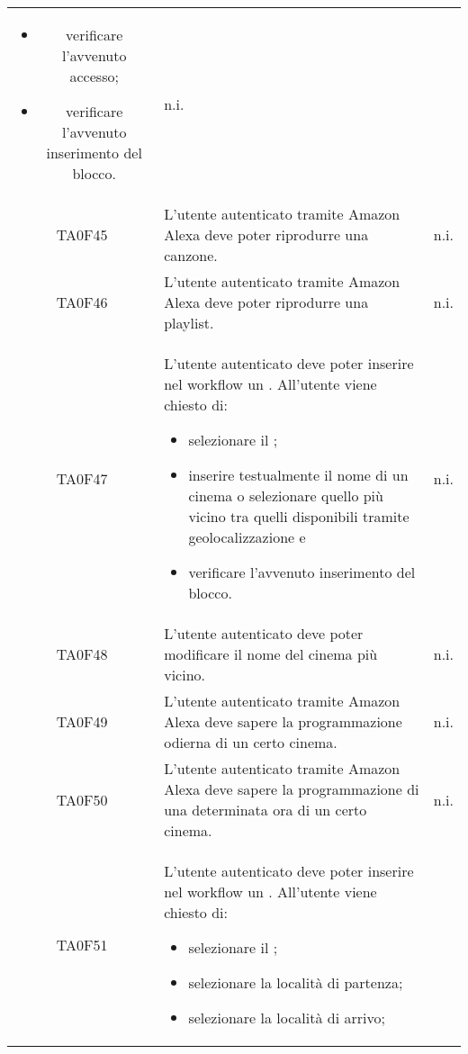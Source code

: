 \begin{center}
\begin{longtable}{ c m{12cm} c }
\begin{itemize}
		\item verificare l'avvenuto accesso;										
		\item verificare l'avvenuto inserimento del blocco.										
	\end{itemize} 																																								& n.i. \\  
	TA0F45   & L'utente autenticato tramite Amazon Alexa deve poter riprodurre una canzone.                                               										& n.i. \\
	TA0F46   & L'utente autenticato tramite Amazon Alexa deve poter riprodurre una playlist.                                             										& n.i. \\
	TA0F47   & L'utente autenticato deve poter inserire nel workflow un \BCinema. All'utente viene chiesto di: \begin{itemize}										
		\item selezionare il \BCinema;										
		\item inserire testualmente il nome di un cinema o selezionare quello più vicino tra quelli disponibili tramite geolocalizzazione										e
		\item verificare l'avvenuto inserimento del blocco.										
	\end{itemize} 																																								& n.i. \\  
	TA0F48   & L'utente autenticato deve poter modificare il nome del cinema più vicino.                                                 										& n.i. \\
	TA0F49   & L'utente autenticato tramite Amazon Alexa deve sapere la programmazione odierna di un certo cinema.                              										& n.i. \\
	TA0F50   & L'utente autenticato tramite Amazon Alexa deve sapere la programmazione di una determinata ora di un certo cinema.                              										& n.i. \\
	TA0F51   & L'utente autenticato deve poter inserire nel workflow un \BTrasporti. All'utente viene chiesto di: \begin{itemize}										
		\item selezionare il \BTrasporti;										
		\item selezionare la località di partenza;										
		\item selezionare la località di arrivo;																				

\end{itemize}
\end{longtable}
\end{center}
